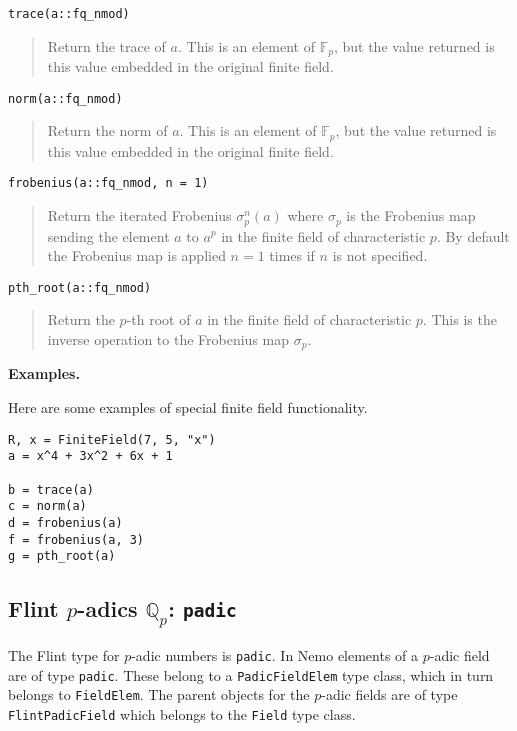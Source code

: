 \documentclass[a4paper,10pt]{article}
\newcommand{\Q}{\mathbb{Q}}
\newcommand{\F}{\mathbb{F}}
\newcommand{\code}{\lstinline}
\newcommand{\desc}[1]{\vspace{-3mm}\begin{quote}#1\end{quote}}
\begin{document}
{{\begin{lstlisting}
trace(a::fq_nmod)
\end{lstlisting}

\desc{Return the trace of $a$. This is an element of $\F_p$, but the value
returned is this value embedded in the original finite field.}

\begin{lstlisting}
norm(a::fq_nmod)
\end{lstlisting}

\desc{Return the norm of $a$. This is an element of $\F_p$, but the value
returned is this value embedded in the original finite field.}

\begin{lstlisting}
frobenius(a::fq_nmod, n = 1)
\end{lstlisting}

\desc{Return the iterated Frobenius $\sigma_p^n(a)$ where $\sigma_p$ is the 
Frobenius map sending the element $a$ to $a^p$ in the finite field of 
characteristic $p$. By default the Frobenius map is applied $n = 1$ times if
$n$ is not specified.}

\begin{lstlisting}
pth_root(a::fq_nmod)
\end{lstlisting}

\desc{Return the $p$-th root of $a$ in the finite field of characteristic
$p$. This is the inverse operation to the Frobenius map $\sigma_p$.}

\textbf{Examples.}

Here are some examples of special finite field functionality.

\begin{lstlisting}
R, x = FiniteField(7, 5, "x")
a = x^4 + 3x^2 + 6x + 1

b = trace(a)
c = norm(a)
d = frobenius(a)
f = frobenius(a, 3)
g = pth_root(a)
\end{lstlisting}

\subsection{Flint $p$-adics $\Q_p$: \code{padic}}

The Flint type for $p$-adic numbers is \code{padic}. In Nemo elements of a
$p$-adic field are of type \code{padic}. These belong to a \code{PadicFieldElem}
type class, which in turn belongs to \code{FieldElem}. The parent objects for 
the $p$-adic fields are of type \code{FlintPadicField} which belongs to the
\code{Field} type class.

}}
\end{document}

